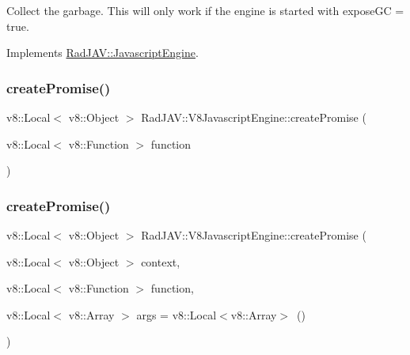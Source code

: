 Collect the garbage. This will only work if the engine is started with expose\+GC = true. 



Implements \mbox{\hyperlink{class_rad_j_a_v_1_1_javascript_engine_a07709e2f1afb9f49444c6605a7a6122f}{Rad\+J\+A\+V\+::\+Javascript\+Engine}}.

\mbox{\label{class_rad_j_a_v_1_1_v8_javascript_engine_ae50f236f667aa73f1cc5b36fc79bfeda}} 
\subsubsection{\texorpdfstring{create\+Promise()}{createPromise()}\hspace{0.1cm}{\footnotesize\ttfamily [1/2]}}
{\footnotesize\ttfamily v8\+::\+Local$<$ v8\+::\+Object $>$ Rad\+J\+A\+V\+::\+V8\+Javascript\+Engine\+::create\+Promise (\begin{DoxyParamCaption}\item[{v8\+::\+Local$<$ v8\+::\+Function $>$}]{function }\end{DoxyParamCaption})}

\mbox{\label{class_rad_j_a_v_1_1_v8_javascript_engine_aeba84f96b6350917eed87a9fc46bff9d}} 
\subsubsection{\texorpdfstring{create\+Promise()}{createPromise()}\hspace{0.1cm}{\footnotesize\ttfamily [2/2]}}
{\footnotesize\ttfamily v8\+::\+Local$<$ v8\+::\+Object $>$ Rad\+J\+A\+V\+::\+V8\+Javascript\+Engine\+::create\+Promise (\begin{DoxyParamCaption}\item[{v8\+::\+Local$<$ v8\+::\+Object $>$}]{context,  }\item[{v8\+::\+Local$<$ v8\+::\+Function $>$}]{function,  }\item[{v8\+::\+Local$<$ v8\+::\+Array $>$}]{args = {\ttfamily v8\+:\+:Local$<$v8\+:\+:Array$>$~()} }\end{DoxyParamCaption})}

